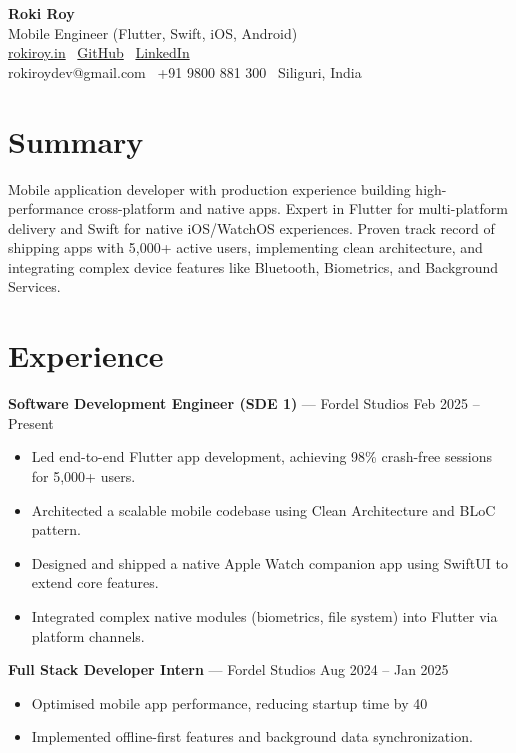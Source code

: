 \documentclass[10pt, letterpaper]{article}
\newenvironment{tightitem}{
    \begin{itemize}[topsep=0pt, itemsep=0pt, parsep=0.3pt, leftmargin=10pt]
}{
    \end{itemize}
}
\begin{document}
\begin{center}
{\fontsize{22pt}{22pt}\selectfont \textbf{Roki Roy}} \\[3pt]
Mobile Engineer (Flutter, Swift, iOS, Android) \\[3pt]
\href{https://rokiroy.in}{rokiroy.in} \textbullet\
\href{https://github.com/royroki}{GitHub} \textbullet\
\href{https://linkedin.com/in/rokiroy}{LinkedIn} \\
rokiroydev@gmail.com \textbullet\ +91 9800 881 300 \textbullet\ Siliguri, India
\end{center}

\section{Summary}

Mobile application developer with production experience building high-performance cross-platform and native apps. Expert in Flutter for multi-platform delivery and Swift for native iOS/WatchOS experiences. Proven track record of shipping apps with 5,000+ active users, implementing clean architecture, and integrating complex device features like Bluetooth, Biometrics, and Background Services.

\section{Experience}

\textbf{Software Development Engineer (SDE 1)} — Fordel Studios \hfill Feb 2025 -- Present  
\begin{tightitem}
\item Led end-to-end Flutter app development, achieving 98\% crash-free sessions for 5,000+ users.
\item Architected a scalable mobile codebase using Clean Architecture and BLoC pattern.
\item Designed and shipped a native Apple Watch companion app using SwiftUI to extend core features.
\item Integrated complex native modules (biometrics, file system) into Flutter via platform channels.
\end{tightitem}

\textbf{Full Stack Developer Intern} — Fordel Studios \hfill Aug 2024 -- Jan 2025  
\begin{tightitem}
\item Optimised mobile app performance, reducing startup time by 40%
\item Implemented offline-first features and background data synchronization.
\end{tightitem}
\end{document}
